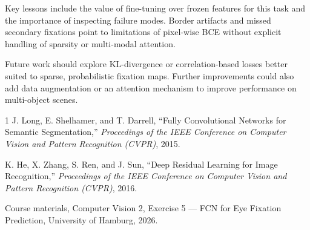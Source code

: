 \documentclass[conference]{IEEEtran}
\begin{document}
Key lessons include the value of fine-tuning over frozen features for this task and the importance of inspecting failure modes. Border artifacts and missed secondary fixations point to limitations of pixel-wise BCE without explicit handling of sparsity or multi-modal attention.

Future work should explore KL-divergence or correlation-based losses better suited to sparse, probabilistic fixation maps. Further improvements could also add data augmentation or an attention mechanism to improve performance on multi-object scenes.

\begin{thebibliography}{1}
J. Long, E. Shelhamer, and T. Darrell, ``Fully Convolutional Networks for Semantic Segmentation,'' \textit{Proceedings of the IEEE Conference on Computer Vision and Pattern Recognition (CVPR)}, 2015.

K. He, X. Zhang, S. Ren, and J. Sun, ``Deep Residual Learning for Image Recognition,'' \textit{Proceedings of the IEEE Conference on Computer Vision and Pattern Recognition (CVPR)}, 2016.

Course materials, Computer Vision 2, Exercise 5 --- FCN for Eye Fixation Prediction, University of Hamburg, 2026.
\end{thebibliography}
\end{document}
